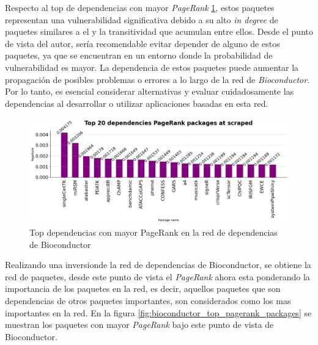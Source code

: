 Respecto al top de dependencias con mayor \textit{PageRank} \ref{fig:bioconductor_top_pagerank_dependencies},
estos paquetes representan una vulnerabilidad significativa debido a su alto \textit{in degree} de paquetes similares a el
y la transitividad que acumulan entre ellos. Desde el punto de vista
del autor, sería recomendable evitar depender de alguno de estos paquetes, ya que se encuentran en un entorno
donde la probabilidad de vulnerabilidad es mayor. La dependencia de estos paquetes puede aumentar la propagación
de posibles problemas o errores a lo largo de la red de \textit{Bioconductor}. Por lo tanto, es esencial
considerar alternativas y evaluar cuidadosamente las dependencias al desarrollar o utilizar aplicaciones
basadas en esta red.

\begin{figure}[ht!]
    \begin{center}
        \includegraphics[width=1\textwidth]{img/bioconductor/top_pagerrank_dependencies.png}
        \caption{Top dependencias con mayor PageRank en la red de dependencias de Bioconductor}
        \label{fig:bioconductor_top_pagerank_dependencies}
    \end{center}
\end{figure}

Realizando una inversionde la red de dependencias de Bioconductor, se obtiene la red de paquetes, desde este punto de vista
el \textit{PageRank} ahora esta ponderando la importancia de los paquetes en la red, es decir, aquellos paquetes que son dependencias
de otros paquetes importantes, son considerados como los mas importantes en la red. En la figura \ref{fig:bioconductor_top_pagerank_packages}
se muestran los paquetes con mayor \textit{PageRank} bajo este punto de vista de Bioconductor.

